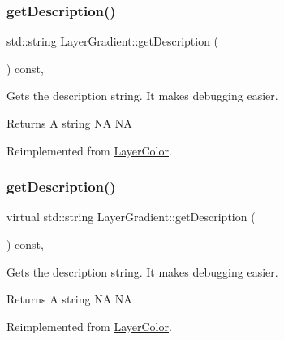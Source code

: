 \subsubsection{\texorpdfstring{get\+Description()}{getDescription()}\hspace{0.1cm}{\footnotesize\ttfamily [1/2]}}
{\footnotesize\ttfamily std\+::string Layer\+Gradient\+::get\+Description (\begin{DoxyParamCaption}{ }\end{DoxyParamCaption}) const\hspace{0.3cm}{\ttfamily [override]}, {\ttfamily [virtual]}}

Gets the description string. It makes debugging easier. \begin{DoxyReturn}{Returns}
A string  NA  NA 
\end{DoxyReturn}


Reimplemented from \hyperlink{classLayerColor_aae6932d9d9e0ae21cc34e1e37d0b2d92}{Layer\+Color}.

\mbox{\label{classLayerGradient_ace9ed0ed0422bdc89a7e440a9f8307d3}} 
\subsubsection{\texorpdfstring{get\+Description()}{getDescription()}\hspace{0.1cm}{\footnotesize\ttfamily [2/2]}}
{\footnotesize\ttfamily virtual std\+::string Layer\+Gradient\+::get\+Description (\begin{DoxyParamCaption}{ }\end{DoxyParamCaption}) const\hspace{0.3cm}{\ttfamily [override]}, {\ttfamily [virtual]}}

Gets the description string. It makes debugging easier. \begin{DoxyReturn}{Returns}
A string  NA  NA 
\end{DoxyReturn}


Reimplemented from \hyperlink{classLayerColor_aae6932d9d9e0ae21cc34e1e37d0b2d92}{Layer\+Color}.

\mbox{\label{classLayerGradient_ada585e11448c9b1fef49310162d7c600}} 
